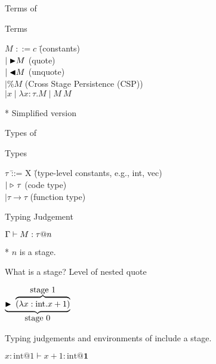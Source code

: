 \documentclass[dvipdfmx,aspectratio=169, 20pt]{beamer}
\renewcommand{\V}{\vdash}
\begin{document}
\begin{frame}[fragile]{Terms of \LTP}
    \begin{block}{Terms}
        \begin{tabbing}
            \hspace{5mm} \( M \) \= \( ::= c \) \hspace{20mm} \= (constants) \\
            \> \( \mid {\mathop{\blacktriangleright}} M \) \> (quote) \\
            \> \( \mid {\mathop{\blacktriangleleft}} M \) \> (unquote) \\
            \> \( \mid \% M \) \> (Cross Stage Persistence (CSP)) \\
            \> \( \mid x \mid \lambda x:\tau.M \mid M\ M \)
        \end{tabbing}
    \end{block}
    * Simplified version
\end{frame}

\begin{frame}[fragile]{Types of \LTP}
    \begin{block}{Types}
        \begin{tabbing}
            \hspace{5mm} \( \tau \) \= ::= X \hspace{20mm} \= (type-level constants, e.g., int, vec) \\
            \> \( \mid {\mathop{\triangleright}}\ \tau \) \> (code type) \\
        \> \( \mid \tau \to \tau \) \> (function type)
    \end{tabbing}
    \end{block}
    
    \begin{block}{Typing Judgement}
        \begin{center}
            \( \G \V M : \tau @ n \)
        \end{center}
        * \( n \) is a stage.
    \end{block}
    
    \note{
    }
    \end{frame}

    \begin{frame}[fragile]{What is a stage?}
        Level of nested quote
        \begin{exampleblock}{}
            \begin{center}
                \( \underbrace{\TB\ \overbrace{(\lambda x:\text{int}.x + 1)}^{\let\scriptstyle\textstyle\substack{\text{stage }1}}}_{\let\scriptstyle\textstyle\substack{\text{stage }0}} \)
            \end{center}
        \end{exampleblock}

    Typing judgements and environments of \LTP include a stage.
    \begin{center}
        \( x:\text{int}@1 \vdash x + 1 : \text{int} {\mathbf{@ 1}} \)
    \end{center}
    \note{
    }
\end{frame}
\end{document}
